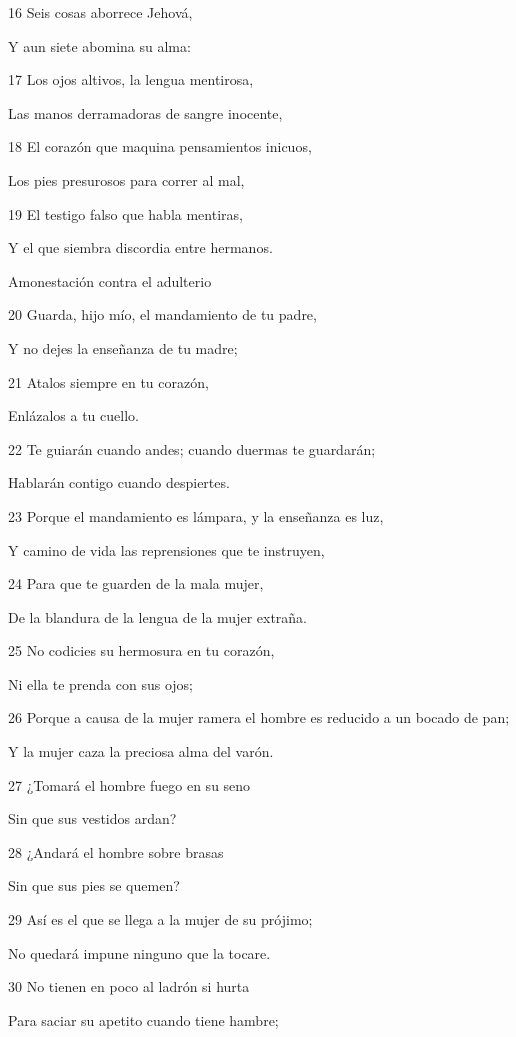 \par 16 Seis cosas aborrece Jehová,
\par Y aun siete abomina su alma:
\par 17 Los ojos altivos, la lengua mentirosa,
\par Las manos derramadoras de sangre inocente,
\par 18 El corazón que maquina pensamientos inicuos,
\par Los pies presurosos para correr al mal,
\par 19 El testigo falso que habla mentiras,
\par Y el que siembra discordia entre hermanos.
\par Amonestación contra el adulterio
\par 20 Guarda, hijo mío, el mandamiento de tu padre,
\par Y no dejes la enseñanza de tu madre;
\par 21 Atalos siempre en tu corazón,
\par Enlázalos a tu cuello.
\par 22 Te guiarán cuando andes; cuando duermas te guardarán;
\par Hablarán contigo cuando despiertes.
\par 23 Porque el mandamiento es lámpara, y la enseñanza es luz,
\par Y camino de vida las reprensiones que te instruyen,
\par 24 Para que te guarden de la mala mujer,
\par De la blandura de la lengua de la mujer extraña.
\par 25 No codicies su hermosura en tu corazón,
\par Ni ella te prenda con sus ojos;
\par 26 Porque a causa de la mujer ramera el hombre es reducido a un bocado de pan;
\par Y la mujer caza la preciosa alma del varón.
\par 27 ¿Tomará el hombre fuego en su seno
\par Sin que sus vestidos ardan?
\par 28 ¿Andará el hombre sobre brasas
\par Sin que sus pies se quemen?
\par 29 Así es el que se llega a la mujer de su prójimo;
\par No quedará impune ninguno que la tocare.
\par 30 No tienen en poco al ladrón si hurta
\par Para saciar su apetito cuando tiene hambre;
